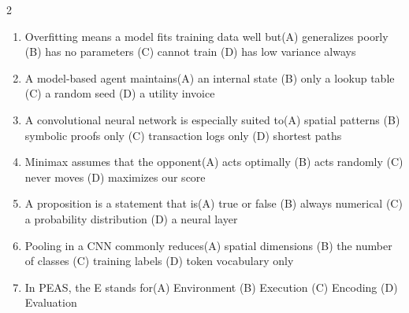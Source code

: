 \documentclass[a4paper]{article}
\begin{document}
\begin{multicols*}{2}
\fontsize{8.5}{10}\selectfont
\begin{enumerate}[resume]
\item Overfitting means a model fits training data well but\newline\hspace*{0.6em}(A) generalizes poorly \quad (B) has no parameters \newline\hspace*{0.6em}(C) cannot train \quad (D) has low variance always
\item A model-based agent maintains\newline\hspace*{0.6em}(A) an internal state \quad (B) only a lookup table \newline\hspace*{0.6em}(C) a random seed \quad (D) a utility invoice
\item A convolutional neural network is especially suited to\newline\hspace*{0.6em}(A) spatial patterns \quad (B) symbolic proofs only \newline\hspace*{0.6em}(C) transaction logs only \quad (D) shortest paths
\item Minimax assumes that the opponent\newline\hspace*{0.6em}(A) acts optimally \quad (B) acts randomly \newline\hspace*{0.6em}(C) never moves \quad (D) maximizes our score
\item A proposition is a statement that is\newline\hspace*{0.6em}(A) true or false \quad (B) always numerical \newline\hspace*{0.6em}(C) a probability distribution \quad (D) a neural layer
\item Pooling in a CNN commonly reduces\newline\hspace*{0.6em}(A) spatial dimensions \quad (B) the number of classes \newline\hspace*{0.6em}(C) training labels \quad (D) token vocabulary only
\item In PEAS, the E stands for\newline\hspace*{0.6em}(A) Environment \quad (B) Execution \newline\hspace*{0.6em}(C) Encoding \quad (D) Evaluation

\end{enumerate}
\end{multicols*}
\end{document}
